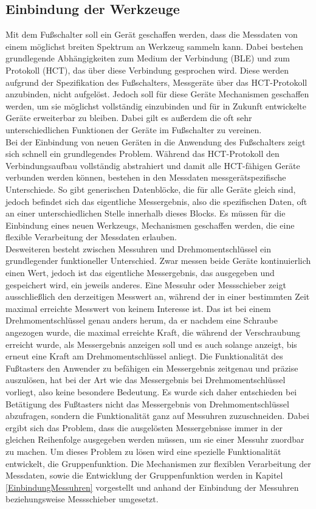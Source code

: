 \subsection{Einbindung der Werkzeuge}
Mit dem Fußschalter soll ein Gerät geschaffen werden, dass die Messdaten von einem möglichst breiten Spektrum an Werkzeug sammeln kann. Dabei bestehen grundlegende Abhängigkeiten zum Medium der Verbindung (\ac{BLE}) und zum Protokoll (\ac{HCT}), das über diese Verbindung gesprochen wird. Diese werden aufgrund der Spezifikation des Fußschalters, Messgeräte über das \ac{HCT}-Protokoll anzubinden, nicht aufgelöst. Jedoch soll für diese Geräte Mechanismen geschaffen werden, um sie möglichst vollständig einzubinden und für in Zukunft entwickelte Geräte erweiterbar zu bleiben. Dabei gilt es außerdem die oft sehr unterschiedlichen Funktionen der Geräte im Fußschalter zu vereinen.\\
Bei der Einbindung von neuen Geräten in die Anwendung des Fußschalters zeigt sich schnell ein grundlegendes Problem. Während das \ac{HCT}-Protokoll den Verbindungsaufbau vollständig abstrahiert und damit alle \ac{HCT}-fähigen Geräte verbunden werden können, bestehen in den Messdaten messgerätspezifische Unterschiede. So gibt generischen Datenblöcke, die für alle Geräte gleich sind, jedoch befindet sich das eigentliche Messergebnis, also die spezifischen Daten, oft an einer unterschiedlichen Stelle innerhalb dieses Blocks. Es müssen für die Einbindung eines neuen Werkzeugs, Mechanismen geschaffen werden, die eine flexible Verarbeitung der Messdaten erlauben.\\
Desweiteren besteht zwischen Messuhren und Drehmomentschlüssel ein grundlegender funktioneller Unterschied. Zwar messen beide Geräte kontinuierlich einen Wert, jedoch ist das eigentliche Messergebnis, das ausgegeben und gespeichert wird, ein jeweils anderes. Eine Messuhr oder Messschieber zeigt ausschließlich den derzeitigen Messwert an, während der in einer bestimmten Zeit maximal erreichte Messwert von keinem Interesse ist. Das ist bei einem Drehmomentschlüssel genau anders herum, da er nachdem eine Schraube angezogen wurde, die maximal erreichte Kraft, die während der Verschraubung erreicht wurde, als Messergebnis anzeigen soll und es auch solange anzeigt, bis erneut eine Kraft am Drehmomentschlüssel anliegt. 
Die Funktionalität des Fußtasters den Anwender zu befähigen ein Messergebnis zeitgenau und präzise auszulösen, hat bei der Art wie das Messergebnis bei Drehmomentschlüssel vorliegt, also keine besondere Bedeutung. Es wurde sich daher entschieden bei Betätigung des Fußtasters nicht das Messergebnis von Drehmomentschlüssel abzufragen, sondern die Funktionalität ganz auf Messuhren zuzuschneiden. Dabei ergibt sich das Problem, dass die ausgelösten Messergebnisse immer in der gleichen Reihenfolge ausgegeben werden müssen, um sie einer Messuhr zuordbar zu machen. Um dieses Problem zu lösen wird eine spezielle Funktionalität entwickelt, die Gruppenfunktion. Die Mechanismen zur flexiblen Verarbeitung der Messdaten, sowie die Entwicklung der Gruppenfunktion werden in Kapitel \ref{EinbindungMessuhren} vorgestellt und anhand der Einbindung der Messuhren beziehungsweise Messschieber umgesetzt.

